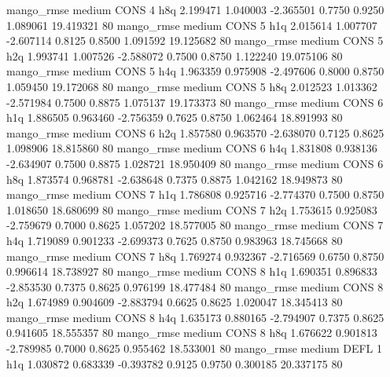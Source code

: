        mango_rmse     medium     CONS                 4                  h8q  2.199471 1.040003 -2.365501 0.7750 0.9250  1.089061   19.419321 80
       mango_rmse     medium     CONS                 5                  h1q  2.015614 1.007707 -2.607114 0.8125 0.8500  1.091592   19.125682 80
       mango_rmse     medium     CONS                 5                  h2q  1.993741 1.007526 -2.588072 0.7500 0.8750  1.122240   19.075106 80
       mango_rmse     medium     CONS                 5                  h4q  1.963359 0.975908 -2.497606 0.8000 0.8750  1.059450   19.172068 80
       mango_rmse     medium     CONS                 5                  h8q  2.012523 1.013362 -2.571984 0.7500 0.8875  1.075137   19.173373 80
       mango_rmse     medium     CONS                 6                  h1q  1.886505 0.963460 -2.756359 0.7625 0.8750  1.062464   18.891993 80
       mango_rmse     medium     CONS                 6                  h2q  1.857580 0.963570 -2.638070 0.7125 0.8625  1.098906   18.815860 80
       mango_rmse     medium     CONS                 6                  h4q  1.831808 0.938136 -2.634907 0.7500 0.8875  1.028721   18.950409 80
       mango_rmse     medium     CONS                 6                  h8q  1.873574 0.968781 -2.638648 0.7375 0.8875  1.042162   18.949873 80
       mango_rmse     medium     CONS                 7                  h1q  1.786808 0.925716 -2.774370 0.7500 0.8750  1.018650   18.680699 80
       mango_rmse     medium     CONS                 7                  h2q  1.753615 0.925083 -2.759679 0.7000 0.8625  1.057202   18.577005 80
       mango_rmse     medium     CONS                 7                  h4q  1.719089 0.901233 -2.699373 0.7625 0.8750  0.983963   18.745668 80
       mango_rmse     medium     CONS                 7                  h8q  1.769274 0.932367 -2.716569 0.6750 0.8750  0.996614   18.738927 80
       mango_rmse     medium     CONS                 8                  h1q  1.690351 0.896833 -2.853530 0.7375 0.8625  0.976199   18.477484 80
       mango_rmse     medium     CONS                 8                  h2q  1.674989 0.904609 -2.883794 0.6625 0.8625  1.020047   18.345413 80
       mango_rmse     medium     CONS                 8                  h4q  1.635173 0.880165 -2.794907 0.7375 0.8625  0.941605   18.555357 80
       mango_rmse     medium     CONS                 8                  h8q  1.676622 0.901813 -2.789985 0.7000 0.8625  0.955462   18.533001 80
       mango_rmse     medium     DEFL                 1                  h1q  1.030872 0.683339 -0.393782 0.9125 0.9750  0.300185   20.337175 80
